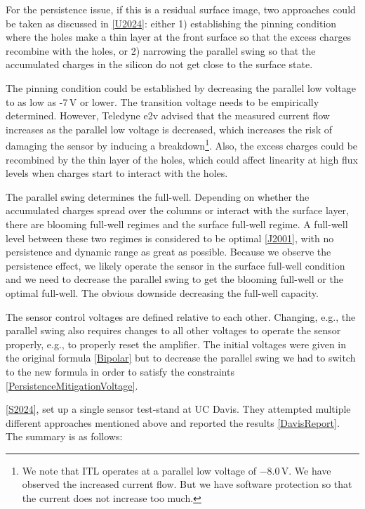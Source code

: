 For the persistence issue, if this is a residual surface image, two
approaches could be taken as discussed in \hyperref[U2024]{{[}U2024{]}}:  
either 1) establishing the pinning condition where the holes make a thin
layer at the front surface so that the excess charges recombine with
the holes, or 2) narrowing the parallel swing so that the accumulated
charges in the silicon do not get close to the surface state.

The pinning condition could be established by decreasing the parallel low
voltage to as low as -7\,V or lower. The transition voltage needs to be
empirically determined. However, Teledyne e2v advised that the measured
current flow increases as the parallel low voltage is decreased, which
increases the risk of damaging the sensor by inducing a
breakdown\footnote{We note that ITL operates at a parallel low voltage
  of $-$8.0\,V. We have observed the increased current flow. But we have
  software protection so that the current does not increase too much.}.
Also, the excess charges could be recombined by the thin layer of
the holes, which could affect linearity at high flux levels when
charges start to interact with the holes.

The parallel swing determines the full-well. Depending on whether the
accumulated charges spread over the columns or interact with the surface
layer, there are blooming full-well regimes and the surface full-well
regime. A full-well level between these two regimes is considered to be
optimal \hyperref[J2001]{{[}J2001{]}}, with no persistence and dynamic range as great as
possible. Because we observe the persistence effect, we likely operate the sensor in the
surface full-well condition and we need to decrease the parallel swing to
get the blooming full-well or the optimal full-well. The obvious downside
decreasing the full-well capacity.

The sensor control voltages are defined relative to each other. Changing, e.g., the parallel
swing also requires changes to all other voltages to
operate the sensor properly, e.g., to properly reset the amplifier.
The initial voltages were given in the original formula
\hyperref[Bipolar]{{[}Bipolar{]}} but to decrease the parallel swing we had
to switch to the new formula in order to satisfy the constraints
\hyperref[PersistenceMitigationVoltage]{{[}PersistenceMitigationVoltage{]}}.

\hyperref[S2024]{{[}S2024{]}}, set up a single sensor test-stand at UC
Davis. They attempted multiple different approaches mentioned above and
reported the results \hyperref[DavisReport]{{[}DavisReport{]}}. The
summary is as follows:

